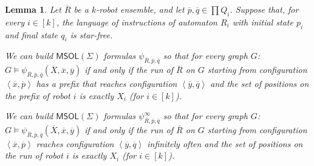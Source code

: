 \documentclass{llncs}
\newtheorem{lemma}{Lemma}
\newcommand{\tup}[1]{\overline{#1}}
\newcommand{\tpl}[1]{\left<{#1}\right>}
\def\msol{\mathsf{MSOL}}
\begin{document}
\begin{lemma} \label{lem:kcompile}
Let $\tup{R}$ be a $k$-robot ensemble, and let $\tup{p}, \tup{q} \in \prod Q_i$. Suppose that, for every $i \in [k]$, the language of instructions of automaton $R_i$ with initial state $p_i$ and final state $q_i$ is star-free.

We can build $\msol(\Sigma)$ formulas $\psi_{\tup{R},\tup{p},\tup{q}}$ so that for every graph $G$:
$G \models \psi_{\tup{R},\tup{p},\tup{q}}(\tup{X},\tup{x},\tup{y})$ if and only if the run of $\tup{R}$ on $G$ starting from configuration $\tpl{\tup{x},\tup{p}}$ has a prefix that reaches configuration $\tpl{\tup{y},\tup{q}}$ and the set of positions on the prefix of robot $i$ is exactly $X_i$ (for $i \in [k]$).

We can build $\msol(\Sigma)$ formulas $\psi^\infty_{\tup{R},\tup{p},\tup{q}}$ so that for every graph $G$: $G \models \psi_{\tup{R},\tup{p},\tup{q}}(\tup{X},\tup{x},\tup{y})$ if and only if the run of $\tup{R}$ on $G$ starting from configuration $\tpl{\tup{x},\tup{p}}$ reaches configuration $\tpl{\tup{y},\tup{q}}$ infinitely often and the set of positions on the run of robot $i$ is exactly $X_i$ (for $i \in [k]$).
\end{lemma}
%
\end{document}
